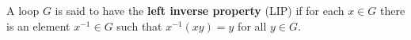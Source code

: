A loop $G$ is said to have the \textbf{left inverse property} (LIP) if for each $x \in G$ there is an element $x^{-1} \in G$ such that $x^{-1}(xy) = y$ for all $y \in G$.
